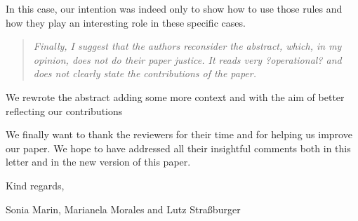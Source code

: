 \documentclass[10pt]{article}
\begin{document}
In this case, our intention was indeed only to show how to use those rules and how 
they play an interesting role in these specific cases.

\begin{quote}\it
Finally, I suggest that the authors reconsider the abstract, which, 
in my opinion, does not do their paper justice. It reads very ?operational? 
and does not clearly state the contributions of the paper.
\end{quote}

We rewrote the abstract adding some more context and with the aim of better reflecting 
our contributions
\medskip

We finally want to thank the reviewers for their time and for helping us improve our paper. 
We hope to have addressed all their insightful comments both in this letter and in the new version of this paper. 
\bigskip

Kind regards,
\medskip

Sonia Marin, Marianela Morales and Lutz Stra\ss burger
\end{document}
